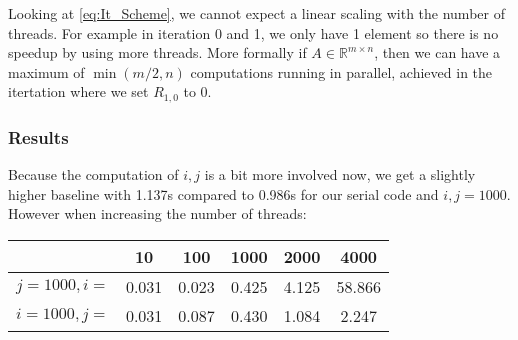 \documentclass[a4paper]{scrartcl}
\begin{document}
                Looking at \ref{eq:It_Scheme}, we cannot expect a linear scaling
                with the number of threads. For example in iteration 0 and 1, we
                only have 1 element so there is no speedup by using more
                threads. More formally if $A \in \mathbb{R}^{m\times n}$, then
                we can have a maximum of $\min(m/2, n)$ computations running in
                parallel, achieved in the itertation where we set $R_{1,0}$ to
                0.

            \subsubsection{Results}
                Because the computation of $i,j$ is a bit more involved now, we
                get a slightly higher baseline with 1.137s compared to 0.986s
                for our serial code and $i,j=1000$. However when increasing the number of threads:\\

            \noindent\begin{tabular}{c|c|c|c|c|c}
                 &10 & 100 & 1000 & 2000 & 4000\\
                \hline
                $j=1000, i=$ & 0.031 & 0.023 & 0.425 & 4.125 & 58.866 \\
                $i=1000, j=$ & 0.031 & 0.087 & 0.430 & 1.084 & 2.247\\
            \end{tabular}\\[10pt]
\end{document}
